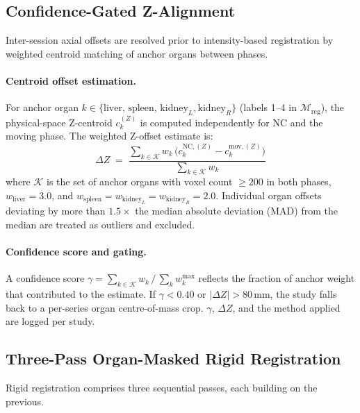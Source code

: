 \documentclass[10pt,twocolumn]{article}
\newcommand{\Mreg}{\mathcal{M}_{\text{reg}}}
\begin{document}
\subsection{Confidence-Gated Z-Alignment}
\label{sec:zalign}

Inter-session axial offsets are resolved prior to intensity-based
registration by weighted centroid matching of anchor organs between
phases.

\paragraph{Centroid offset estimation.}
For anchor organ $k \in \{\text{liver, spleen, kidney}_L, \text{kidney}_R\}$
(labels 1--4 in $\Mreg$), the physical-space Z-centroid $c_k^{(Z)}$
is computed independently for NC and the moving phase.
The weighted Z-offset estimate is:
%
\begin{equation}
  \Delta Z \;=\;
  \frac{\displaystyle\sum_{k \in \mathcal{K}} w_k\,
        \bigl(c_k^{\text{NC},(Z)} - c_k^{\text{mov},(Z)}\bigr)}
       {\displaystyle\sum_{k \in \mathcal{K}} w_k}
  \label{eq:zoffset}
\end{equation}
%
where $\mathcal{K}$ is the set of anchor organs with voxel count
$\geq\!200$ in both phases, $w_\text{liver}=3.0$, and
$w_{\text{spleen}} = w_{\text{kidney}_L} = w_{\text{kidney}_R} = 2.0$.
Individual organ offsets deviating by more than $1.5\times$ the median
absolute deviation (MAD) from the median are treated as outliers and
excluded.

\paragraph{Confidence score and gating.}
A confidence score $\gamma = {\sum_{k\in\mathcal{K}} w_k} \,/\,
{\sum_k w_k^{\max}}$ reflects the fraction of anchor weight
that contributed to the estimate.
If $\gamma < 0.40$ or $|\Delta Z| > 80$\,mm, the study falls back to
a per-series organ centre-of-mass crop.
$\gamma$, $\Delta Z$, and the method applied are logged per study.

\subsection{Three-Pass Organ-Masked Rigid Registration}
\label{sec:rigid}

Rigid registration comprises three sequential passes, each building on
the previous.
\end{document}
